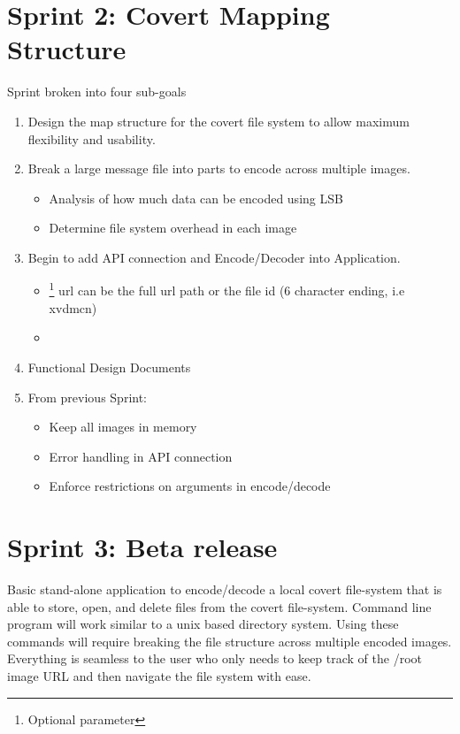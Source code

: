 \documentclass[letterpaper,10pt,english]{sphinxmanual}
\begin{document}
\section{Sprint 2: Covert Mapping Structure}
\label{index:sprint-2-covert-mapping-structure}
Sprint broken into four sub-goals
\begin{enumerate}
\item {} 
Design the map structure for the covert file system to allow maximum flexibility and usability.

\item {} 
Break a large message file into parts to encode across multiple images.
\begin{itemize}
\item {} 
Analysis of how much data can be encoded using LSB

\item {} 
Determine file system overhead in each image

\end{itemize}

\item {} 
Begin to add API connection and Encode/Decoder into Application.
\begin{itemize}
\item {} 
 \footnote[1]{
Optional parameter
} url can be the full url path or the file id (6 character ending, i.e xvdmcn)

\item {} 

\end{itemize}

\item {} 
Functional Design Documents

\item {} 
From previous Sprint:
\begin{itemize}
\item {} 
Keep all images in memory

\item {} 
Error handling in API connection

\item {} 
Enforce restrictions on arguments in encode/decode

\end{itemize}

\end{enumerate}


\section{Sprint 3: Beta release}
\label{index:sprint-3-beta-release}
Basic stand-alone application to encode/decode a local covert file-system that is able to store, open, and delete files from the covert file-system. Command line program will work similar to a unix based directory system. Using these commands will require breaking the file structure across multiple encoded images. Everything is seamless to the user who only needs to keep track of the /root image URL and then navigate the file system with ease.
\end{document}
